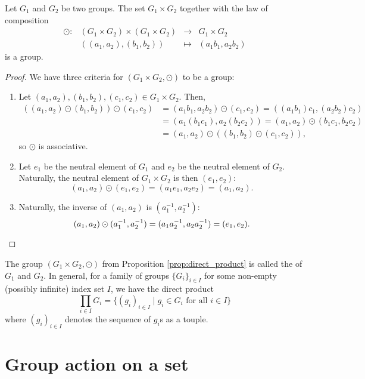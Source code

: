 \begin{prop}\label{prop:direct_product}
Let $ G_1 $ and $ G_2 $ be two groups. The set $ G_1\times G_2 $ together with the law of composition
\begin{equation*}
    \begin{array}{rccc}
        \odot: & (G_1\times G_2)\times(G_1\times G_2) & \to & G_1\times G_2 \\
        & ((a_1,a_2),(b_1,b_2)) & \mapsto & (a_1b_1,a_2b_2)
    \end{array}
\end{equation*}
is a group.
\end{prop}
\begin{proof}
We have three criteria for $ (G_1\times G_2,\odot) $ to be a group:
\begin{enumerate}
    \item Let $ (a_1,a_2),(b_1,b_2),(c_1,c_2)\in G_1\times G_2 $. Then,
    \begin{align*}
        ((a_1,a_2)\odot(b_1,b_2))\odot(c_1,c_2) &=(a_1b_1,a_2b_2)\odot(c_1,c_2)=((a_1b_1)c_1,(a_2b_2)c_2) \\
        &= (a_1(b_1c_1),a_2(b_2c_2))=(a_1,a_2)\odot(b_1c_1,b_2c_2) \\
        &= (a_1,a_2)\odot((b_1,b_2)\odot(c_1,c_2)),
    \end{align*}
    so $ \odot $ is associative.
    \item Let $ e_1 $ be the neutral element of $ G_1 $ and $ e_2 $ be the neutral element of $ G_2 $. Naturally, the neutral element of $ G_1\times G_2 $ is then $ (e_1,e_2) $:
    \begin{equation*}
        (a_1,a_2)\odot(e_1,e_2)=(a_1e_1,a_2e_2)=(a_1,a_2).
    \end{equation*}
    \item Naturally, the inverse of $ (a_1,a_2) $ is $ (a_1^{-1},a_2^{-1}) $:
    \begin{equation*}
        (a_1,a_2)\odot(a_1^{-1},a_2^{-1})=(a_1a_2^{-1},a_2a_2^{-1})=(e_1,e_2).\qedhere
    \end{equation*}
\end{enumerate}
\end{proof}

\begin{defn}
The group $ (G_1\times G_2,\odot) $ from Proposition \ref{prop:direct_product} is called the  of $ G_1 $ and $ G_2 $. In general, for a family of groups $ \{G_i\}_{i\in I} $ for some non-empty (possibly infinite) index set $ I $, we have the direct product
\begin{equation*}
    \prod_{i\in I}G_i=\{(g_i)_{i\in I}\mid g_i\in G_i\text{ for all }i\in I\}
\end{equation*}
where $ (g_i)_{i\in I} $ denotes the sequence of $ g_i $s as a touple.
\end{defn}

\section{Group action on a set}